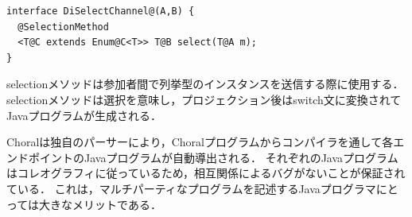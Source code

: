 \documentclass{thesis}
\begin{document}
\begin{lstlisting}[caption=selectionメソッドの定義,label=select]
interface DiSelectChannel@(A,B) {
  @SelectionMethod
  <T@C extends Enum@C<T>> T@B select(T@A m);
} 
\end{lstlisting}
selectionメソッドは参加者間で列挙型のインスタンスを送信する際に使用する．
selectionメソッドは選択を意味し，プロジェクション後はswitch文に変換されてJavaプログラムが生成される．

Choralは独自のパーサーにより，Choralプログラムからコンパイラを通して各エンドポイントのJavaプログラムが自動導出される．
それぞれのJavaプログラムはコレオグラフィに従っているため，相互関係によるバグがないことが保証されている．
これは，マルチパーティなプログラムを記述するJavaプログラマにとっては大きなメリットである．

\end{document}
